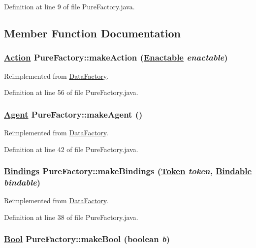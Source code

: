 Definition at line 9 of file Pure\-Factory.java.

\subsection{Member Function Documentation}
\hypertarget{classPureFactory_a13}{
\subsubsection[makeAction]{\setlength{\rightskip}{0pt plus 5cm}\hyperlink{interfaceAction}{Action} Pure\-Factory::make\-Action (\hyperlink{interfaceEnactable}{Enactable} {\em enactable})}}
\label{classPureFactory_a13}




Reimplemented from \hyperlink{interfaceDataFactory_a8}{Data\-Factory}.

Definition at line 56 of file Pure\-Factory.java.\hypertarget{classPureFactory_a9}{
\subsubsection[makeAgent]{\setlength{\rightskip}{0pt plus 5cm}\hyperlink{interfaceAgent}{Agent} Pure\-Factory::make\-Agent ()}}
\label{classPureFactory_a9}




Reimplemented from \hyperlink{interfaceDataFactory_a11}{Data\-Factory}.

Definition at line 42 of file Pure\-Factory.java.\hypertarget{classPureFactory_a8}{
\subsubsection[makeBindings]{\setlength{\rightskip}{0pt plus 5cm}\hyperlink{interfaceBindings}{Bindings} Pure\-Factory::make\-Bindings (\hyperlink{interfaceToken}{Token} {\em token}, \hyperlink{interfaceBindable}{Bindable} {\em bindable})}}
\label{classPureFactory_a8}




Reimplemented from \hyperlink{interfaceDataFactory_a10}{Data\-Factory}.

Definition at line 38 of file Pure\-Factory.java.\hypertarget{classPureFactory_a3}{
\subsubsection[makeBool]{\setlength{\rightskip}{0pt plus 5cm}\hyperlink{interfaceBool}{Bool} Pure\-Factory::make\-Bool (boolean {\em b})}}
\label{classPureFactory_a3}




